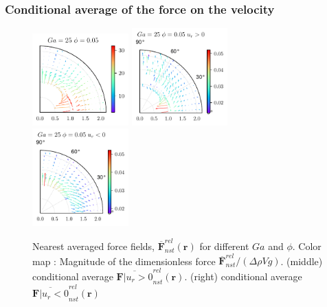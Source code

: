 \documentclass{sintefbeamer}
\newcommand{\nstrelavg}[1]{\overline{#1}_{nst}^{rel}}
\begin{document}
\begin{frame}
  \frametitle{Conditional average of the force on the velocity}
  \begin{figure}
    \centering
    \includegraphics[width=0.33\textwidth]{image/HOMOGENEOUS/fDrop/F_mu_r_0_1_Ga_25_PHI_0_05.pdf}
    \includegraphics[width=0.33\textwidth]{image/HOMOGENEOUS/fDrop/Fpos_mu_r_0_1_Ga_25_PHI_0_05.pdf}
    \includegraphics[width=0.33\textwidth]{image/HOMOGENEOUS/fDrop/Fneg_mu_r_0_1_Ga_25_PHI_0_05.pdf}
    \caption{Nearest averaged force fields, $\nstrelavg{\textbf{F}}(\textbf{r})$ for different $Ga$ and $\phi$. 
    Color map : Magnitude of the dimensionless force  $\nstrelavg{\textbf{F}} / (\Delta \rho V g)$.
    (middle) conditional average  $\nstrelavg{\textbf{F}| u_r > 0}(\textbf{r})$. 
    (right) conditional average  $\nstrelavg{\textbf{F}| u_r < 0}(\textbf{r})$ }
  \end{figure}
\end{frame}
\end{document}
